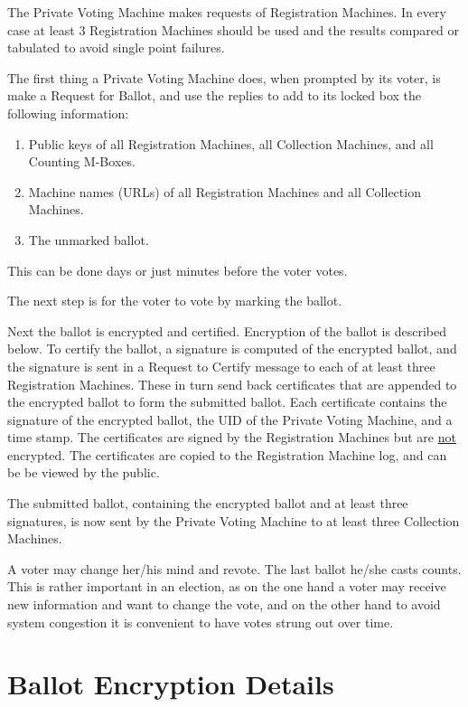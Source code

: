 \documentclass[12pt]{article}
\begin{document}
The Private Voting Machine
makes requests of Registration Machines.  In every case
at least 3 Registration Machines should be used and the
results compared or tabulated to avoid single point failures.

The first thing a Private Voting Machine does, when prompted by
its voter, is make a Request for Ballot, and use the replies to
add to its locked box the following information:
\begin{enumerate}
\setcounter{enumi}{\value{PVM-COUNTER}}
\item Public keys of all Registration Machines, all Collection
Machines, and all Counting M-Boxes.
\item Machine names (URLs) of all Registration Machines and all Collection
Machines.
\item The unmarked ballot.
\end{enumerate}
This can be done days or just minutes before the voter votes.

The next step is for the voter to vote by marking the ballot.

Next the ballot is encrypted and certified.  Encryption of the
ballot is described below.  To certify the ballot, a signature
is computed of the encrypted ballot, and the signature is sent
in a Request to Certify message to each of at least three Registration
Machines.  These in turn send back certificates that are appended
to the encrypted ballot to form the submitted ballot.  Each
certificate contains the signature of the encrypted ballot, the
UID of the Private Voting Machine, and a time stamp.  The certificates
are signed by the Registration Machines but are \underline{not} encrypted.
The certificates are copied to the Registration Machine log, and can be
be viewed by the public.

The submitted ballot, containing the encrypted ballot and
at least three signatures, is now sent by the Private Voting
Machine to at least three Collection Machines.

A voter may change her/his mind and revote.  The last ballot
he/she casts counts.  This is rather important in an election,
as on the one hand a voter may receive new information and
want to change the vote, and on the other hand to avoid system
congestion it is convenient to have votes strung out over time.

\section{Ballot Encryption Details}
\end{document}

